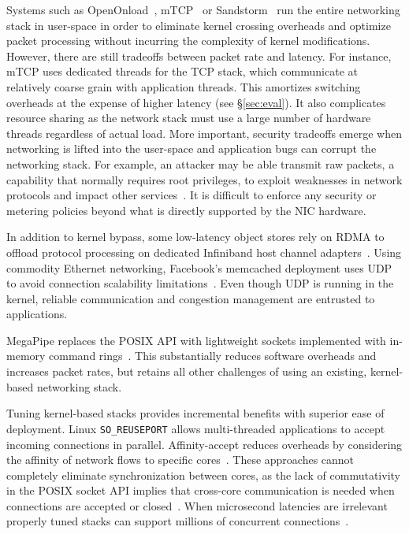  Systems such as
OpenOnload~\cite{openonload}, mTCP~\cite{jeong2014mtcp} or
Sandstorm~\cite{sandstorm} run the entire networking stack in
user-space in order to eliminate kernel crossing overheads and
optimize packet processing without incurring the complexity of kernel
modifications. However, there are still tradeoffs between packet rate
and latency. For instance, mTCP uses dedicated threads for the TCP
stack, which communicate at relatively coarse grain with application
threads. This amortizes switching overheads at the expense of higher
latency (see \S\ref{sec:eval}). It also complicates resource sharing
as the network stack must use a large number of hardware threads
regardless of actual load. More important, security tradeoffs emerge
when networking is lifted into the user-space and application bugs can
corrupt the networking stack. For example, an attacker may be able
transmit raw packets, a capability that normally requires root
privileges, to exploit weaknesses in network protocols and impact
other services~\cite{DBLP:conf/acsac/Bellovin04}. It is difficult to
enforce any security or metering policies beyond what is directly
supported by the NIC hardware.

 In addition to kernel bypass, some
low-latency object stores rely on RDMA to offload protocol processing
on dedicated Infiniband host channel
adapters~\cite{DBLP:conf/icpp/JoseSLZHWIOWSP11,DBLP:conf/sosp/OngaroRSOR11,mitchell:rdma,dragojevic14farm}.
 Using commodity Ethernet
networking, Facebook's memcached deployment uses UDP to avoid
connection scalability
limitations~\cite{DBLP:conf/nsdi/NishtalaFGKLLMPPSSTV13}. Even though
UDP is running in the kernel, reliable communication and congestion
management are entrusted to applications.

 MegaPipe replaces the POSIX
API with lightweight sockets implemented with in-memory command
rings~\cite{DBLP:conf/osdi/HanMCR12}. This substantially reduces
software overheads and increases packet rates, but retains all other
challenges of using an existing, kernel-based networking stack.

 Tuning kernel-based stacks provides
incremental benefits with superior ease of deployment.  Linux
\texttt{SO\_REUSEPORT} allows multi-threaded applications to accept
incoming connections in parallel. Affinity-accept reduces overheads by
considering the affinity of network flows to specific
cores~\cite{DBLP:conf/eurosys/PesterevSZM12}. These approaches cannot
completely eliminate synchronization between cores, as the lack of
commutativity in the POSIX socket API implies that cross-core
communication is needed when connections are accepted or
closed~\cite{DBLP:conf/sosp/ClementsKZMK13}. When microsecond
latencies are
irrelevant %
properly tuned stacks can support millions of concurrent
connections~\cite{whatsapp-2mil}.
